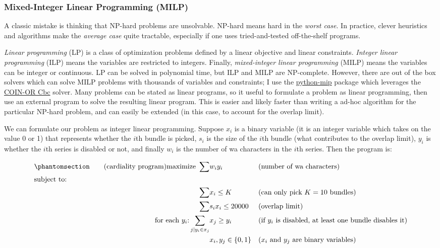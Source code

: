 \documentclass[11pt, oneside]{article}
\theoremstyle{plain}
\theoremstyle{definition}
\begin{document}
\subsubsection{Mixed-Integer Linear Programming (MILP)}
A classic mistake is thinking that NP-hard problems are unsolvable. NP-hard
means hard in the \textit{worst case}. In practice, clever heuristics and
algorithms make the \textit{average case} quite tractable, especially if one
uses tried-and-tested off-the-shelf programs.

\textit{Linear programming} (LP) is a class of optimization problems defined
by a linear objective and linear constraints. \textit{Integer linear
programming} (ILP) means the variables are restricted to integers. Finally,
\textit{mixed-integer linear programming} (MILP) means the variables can
be integer or continuous. LP can be solved in polynomial time, but ILP and
MILP are NP-complete. However, there are out of the box solvers which can
solve MILP problems with thousands of variables and constraints; I use the
\href{https://www.python-mip.com/}{python-mip} package which leverages the
\href{https://projects.coin-or.org/Cbc}{COIN-OR Cbc} solver. Many problems
can be stated as linear programs, so it useful to formulate a problem as
linear programming, then use an external program to solve the resulting
linear program. This is easier and likely faster than writing a ad-hoc
algorithm for the particular NP-hard problem, and can easily be extended
(in this case, to account for the overlap limit).

We can formulate our problem as integer linear programming. Suppose \( x_i \)
is a binary variable (it is an integer variable which takes on the value 0 or
1) that represents whether the \( i \)th bundle is picked, \( s_i \) is the
size of the \( i \)th bundle (what contributes to the overlap limit), \( y_i
\) is whether the \( i \)th series is disabled or not, and finally \( w_i \)
is the number of wa characters in the \( i \)th series. Then the program is:

\begin{align*}   
  \phantomsection
  \tag{cardiality program} \label{eq:char} 
  \text{maximize } \sum& w_i y_i && \text{(number of wa characters)} \\
  \shortintertext{subject to:}
  \sum& x_i \leq K && \text{(can only pick \( K = 10 \) bundles)} \\
  \sum& s_i x_i \leq 20000 && \text{(overlap limit)} \\
  \text{for each \( y_i \):} \sum_{j | y_i \in x_j}& x_j \geq y_i && 
  \text{(if \( y_i \) is disabled, at least one bundle disables it)} \\
  &x_i, y_j \in \{0, 1\} && \text{(\( x_i \) and \( y_j \) are binary variables)}
\end{align*}
\end{document}
